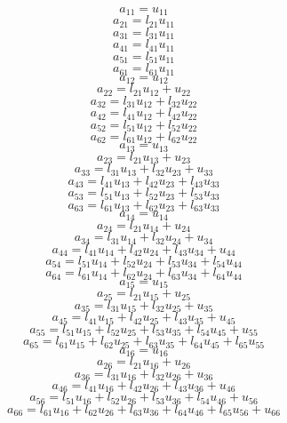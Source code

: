 \documentclass[10pt,a4paper,dvipdfmx]{article}
\begin{document}
\begin{multicols}{2}
$$ a_{{1}{1}} = u_{{1}{1}} $$
$$ a_{{2}{1}} = l_{{2}{1}} u_{{1}{1}} $$
$$ a_{{3}{1}} = l_{{3}{1}} u_{{1}{1}} $$
$$ a_{{4}{1}} = l_{{4}{1}} u_{{1}{1}} $$
$$ a_{{5}{1}} = l_{{5}{1}} u_{{1}{1}} $$
$$ a_{{6}{1}} = l_{{6}{1}} u_{{1}{1}} $$
$$ a_{{1}{2}} = u_{{1}{2}} $$
$$ a_{{2}{2}} = l_{{2}{1}} u_{{1}{2}} + u_{{2}{2}} $$
$$ a_{{3}{2}} = l_{{3}{1}} u_{{1}{2}} + l_{{3}{2}} u_{{2}{2}} $$
$$ a_{{4}{2}} = l_{{4}{1}} u_{{1}{2}} + l_{{4}{2}} u_{{2}{2}} $$
$$ a_{{5}{2}} = l_{{5}{1}} u_{{1}{2}} + l_{{5}{2}} u_{{2}{2}} $$
$$ a_{{6}{2}} = l_{{6}{1}} u_{{1}{2}} + l_{{6}{2}} u_{{2}{2}} $$
$$ a_{{1}{3}} = u_{{1}{3}} $$
$$ a_{{2}{3}} = l_{{2}{1}} u_{{1}{3}} + u_{{2}{3}} $$
$$ a_{{3}{3}} = l_{{3}{1}} u_{{1}{3}} + l_{{3}{2}} u_{{2}{3}} + u_{{3}{3}} $$
$$ a_{{4}{3}} = l_{{4}{1}} u_{{1}{3}} + l_{{4}{2}} u_{{2}{3}} + l_{{4}{3}} u_{{3}{3}} $$
$$ a_{{5}{3}} = l_{{5}{1}} u_{{1}{3}} + l_{{5}{2}} u_{{2}{3}} + l_{{5}{3}} u_{{3}{3}} $$
$$ a_{{6}{3}} = l_{{6}{1}} u_{{1}{3}} + l_{{6}{2}} u_{{2}{3}} + l_{{6}{3}} u_{{3}{3}} $$
$$ a_{{1}{4}} = u_{{1}{4}} $$
$$ a_{{2}{4}} = l_{{2}{1}} u_{{1}{4}} + u_{{2}{4}} $$
$$ a_{{3}{4}} = l_{{3}{1}} u_{{1}{4}} + l_{{3}{2}} u_{{2}{4}} + u_{{3}{4}} $$
$$ a_{{4}{4}} = l_{{4}{1}} u_{{1}{4}} + l_{{4}{2}} u_{{2}{4}} + l_{{4}{3}} u_{{3}{4}} + u_{{4}{4}} $$
$$ a_{{5}{4}} = l_{{5}{1}} u_{{1}{4}} + l_{{5}{2}} u_{{2}{4}} + l_{{5}{3}} u_{{3}{4}} + l_{{5}{4}} u_{{4}{4}} $$
$$ a_{{6}{4}} = l_{{6}{1}} u_{{1}{4}} + l_{{6}{2}} u_{{2}{4}} + l_{{6}{3}} u_{{3}{4}} + l_{{6}{4}} u_{{4}{4}} $$
$$ a_{{1}{5}} = u_{{1}{5}} $$
$$ a_{{2}{5}} = l_{{2}{1}} u_{{1}{5}} + u_{{2}{5}} $$
$$ a_{{3}{5}} = l_{{3}{1}} u_{{1}{5}} + l_{{3}{2}} u_{{2}{5}} + u_{{3}{5}} $$
$$ a_{{4}{5}} = l_{{4}{1}} u_{{1}{5}} + l_{{4}{2}} u_{{2}{5}} + l_{{4}{3}} u_{{3}{5}} + u_{{4}{5}} $$
$$ a_{{5}{5}} = l_{{5}{1}} u_{{1}{5}} + l_{{5}{2}} u_{{2}{5}} + l_{{5}{3}} u_{{3}{5}} + l_{{5}{4}} u_{{4}{5}} + u_{{5}{5}} $$
$$ a_{{6}{5}} = l_{{6}{1}} u_{{1}{5}} + l_{{6}{2}} u_{{2}{5}} + l_{{6}{3}} u_{{3}{5}} + l_{{6}{4}} u_{{4}{5}} + l_{{6}{5}} u_{{5}{5}} $$
$$ a_{{1}{6}} = u_{{1}{6}} $$
$$ a_{{2}{6}} = l_{{2}{1}} u_{{1}{6}} + u_{{2}{6}} $$
$$ a_{{3}{6}} = l_{{3}{1}} u_{{1}{6}} + l_{{3}{2}} u_{{2}{6}} + u_{{3}{6}} $$
$$ a_{{4}{6}} = l_{{4}{1}} u_{{1}{6}} + l_{{4}{2}} u_{{2}{6}} + l_{{4}{3}} u_{{3}{6}} + u_{{4}{6}} $$
$$ a_{{5}{6}} = l_{{5}{1}} u_{{1}{6}} + l_{{5}{2}} u_{{2}{6}} + l_{{5}{3}} u_{{3}{6}} + l_{{5}{4}} u_{{4}{6}} + u_{{5}{6}} $$
$$ a_{{6}{6}} = l_{{6}{1}} u_{{1}{6}} + l_{{6}{2}} u_{{2}{6}} + l_{{6}{3}} u_{{3}{6}} + l_{{6}{4}} u_{{4}{6}} + l_{{6}{5}} u_{{5}{6}} + u_{{6}{6}} $$

\end{multicols}
\end{document}
